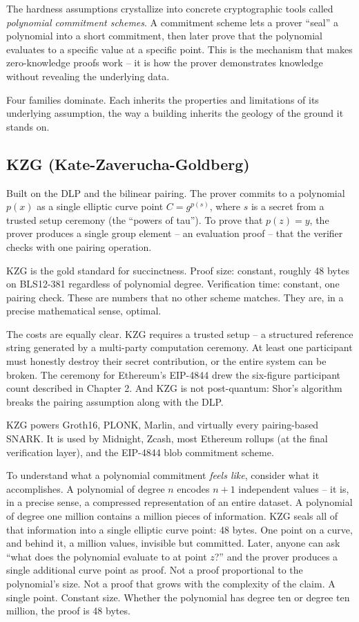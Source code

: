 \documentclass[
  11pt,
  openany]{report}
\begin{document}
The hardness assumptions crystallize into concrete cryptographic tools called
\emph{polynomial commitment schemes}. A commitment scheme lets a prover ``seal''
a polynomial into a short commitment, then later prove that the polynomial
evaluates to a specific value at a specific point. This is the mechanism that
makes zero-knowledge proofs work -- it is how the prover demonstrates knowledge
without revealing the underlying data.

Four families dominate. Each inherits the properties and limitations of its
underlying assumption, the way a building inherits the geology of the ground it
stands on.

\subsection{KZG (Kate-Zaverucha-Goldberg)}\label{kzg-kate-zaverucha-goldberg}

Built on the DLP and the bilinear pairing. The prover commits to a polynomial
\(p(x)\) as a single elliptic curve point \(C = g^{p(s)}\), where \(s\) is a
secret from a trusted setup ceremony (the ``powers of tau''). To prove that
\(p(z) = y\), the prover produces a single group element -- an evaluation proof
-- that the verifier checks with one pairing operation.

KZG is the gold standard for succinctness. Proof size: constant, roughly 48
bytes on BLS12-381 regardless of polynomial degree. Verification time: constant,
one pairing check. These are numbers that no other scheme matches. They are, in
a precise mathematical sense, optimal.

The costs are equally clear. KZG requires a trusted setup -- a structured
reference string generated by a multi-party computation ceremony. At least one
participant must honestly destroy their secret contribution, or the entire
system can be broken. The ceremony for Ethereum's EIP-4844 drew the six-figure
participant count described in Chapter 2. And KZG is not post-quantum: Shor's
algorithm breaks the pairing assumption along with the DLP.

KZG powers Groth16, PLONK, Marlin, and virtually every pairing-based SNARK. It
is used by Midnight, Zcash, most Ethereum rollups (at the final verification
layer), and the EIP-4844 blob commitment scheme.

To understand what a polynomial commitment \emph{feels like}, consider what it
accomplishes. A polynomial of degree \(n\) encodes \(n + 1\) independent values
-- it is, in a precise sense, a compressed representation of an entire dataset.
A polynomial of degree one million contains a million pieces of information. KZG
seals all of that information into a single elliptic curve point: 48 bytes. One
point on a curve, and behind it, a million values, invisible but committed.
Later, anyone can ask ``what does the polynomial evaluate to at point \(z\)?''
and the prover produces a single additional curve point as proof. Not a proof
proportional to the polynomial's size. Not a proof that grows with the
complexity of the claim. A single point. Constant size. Whether the polynomial
has degree ten or degree ten million, the proof is 48 bytes.
\end{document}
